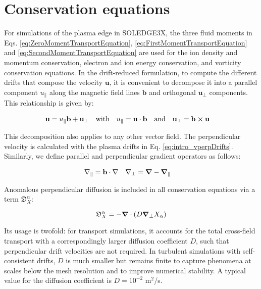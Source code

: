 \section{Conservation equations}
\label{sec:S3X_TransportEquations}

For simulations of the plasma edge in SOLEDGE3X, the three fluid moments in Eqs. \ref{eq:ZeroMomentTransportEquation}, \ref{eq:FirstMomentTransportEquation} and \ref{eq:SecondMomentTransportEquation} are used for the ion density and momentum conservation, electron and ion energy conservation, and vorticity conservation equations. In the drift-reduced formulation, to compute the different drifts that compose the velocity $\mathbf{u}$, it is convenient to decompose it into a parallel component $u_\parallel$ along the magnetic field lines $\mathbf{b}$ and orthogonal $\mathbf{u}_\perp$ components. This relationship is given by:

\begin{align}
	\label{eq:RelationPerpParallelVelocity}
	\mathbf{u} &= u_\parallel \mathbf{b} + \mathbf{u}_\perp & \text{with} \quad u_\parallel = \mathbf{u}\cdot\mathbf{b} \quad &\text{and} \quad \mathbf{u}_\perp = \mathbf{b}\cross\mathbf{u}
\end{align}

This decomposition also applies to any other vector field. The perpendicular velocity is calculated with the plasma drifts in Eq. \ref{eq:intro_vperpDrifts}. Similarly, we define parallel and perpendicular gradient operators as follows:

\begin{align}
	\nabla_\parallel &= \mathbf{b}\cdot\nabla & \nabla_\perp &= \grad - \grad_\parallel
\end{align}

Anomalous perpendicular diffusion is included in all conservation equations via a term $\mathfrak{D}_X^\alpha$:

\begin{equation}
	\mathfrak{D}_X^\alpha = -\grad\cdot\left(D\grad_\perp X_\alpha\right)
\end{equation}

Its usage is twofold: for transport simulations, it accounts for the total cross-field transport with a correspondingly larger diffusion coefficient $D$, such that perpendicular drift velocities are not required. In turbulent simulations with self-consistent drifts, $D$ is much smaller but remains finite to capture phenomena at scales below the mesh resolution and to improve numerical stability. A typical value for the diffusion coefficient is $D = 10^{-2}$ m$^2$/s. \\

